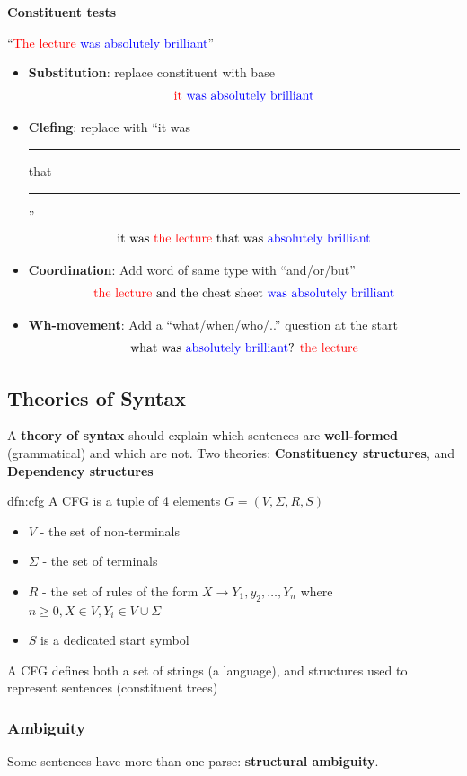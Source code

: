 \documentclass[landscape, 8pt]{extarticle}
\begin{document}
\begin{multicols}{3}
\textbf{Constituent tests}

``\textcolor{red}{The lecture} \textcolor{blue}{was absolutely brilliant}'' 
\begin{itemize}
    \setlength\itemsep{0em}
    \item \textbf{Substitution}: replace constituent with base
        \[\text{\textcolor{red}{it} \textcolor{blue}{was absolutely brilliant}}\]
    \item \textbf{Clefing}: replace with ``it was \rule{15pt}{0.15pt} that \rule{15pt}{0.15pt}''
        \[\text{it was \textcolor{red}{the lecture} that was \textcolor{blue}{absolutely brilliant}}\]
    \item \textbf{Coordination}: Add word of same type with ``and/or/but''
        \[\text{\textcolor{red}{the lecture} and the cheat sheet \textcolor{blue}{was absolutely brilliant}}\]
    \item \textbf{Wh-movement}: Add a ``what/when/who/..'' question at the start
        \[\text{what was \textcolor{blue}{absolutely brilliant}? \textcolor{red}{the lecture}}\]
\end{itemize}

\subsection{Theories of Syntax}
A \textbf{theory of syntax} should explain which sentences are \textbf{well-formed} (grammatical) and which are not. Two theories: \textbf{Constituency structures}, and \textbf{Dependency structures}

\begin{dfn}{dfn:cfg}{}
    A CFG is a tuple of 4 elements $G = (V, \Sigma, R, S)$
    \begin{itemize}
        \setlength\itemsep{0em}
        \item $V$ - the set of non-terminals
        \item $\Sigma$ - the set of terminals
        \item $R$ - the set of rules of the form $X \to Y_{1}, y_{2},\dots,Y_{n}$ where $n\ge 0, X\in V, Y_{i}\in V \cup \Sigma$
        \item $S$ is a dedicated start symbol
    \end{itemize}
    A CFG defines both a set of strings (a language), and structures used to represent sentences (constituent trees)
\end{dfn}

\subsubsection{Ambiguity}
Some sentences have more than one parse: \textbf{structural ambiguity}.


\end{multicols}
\end{document}
